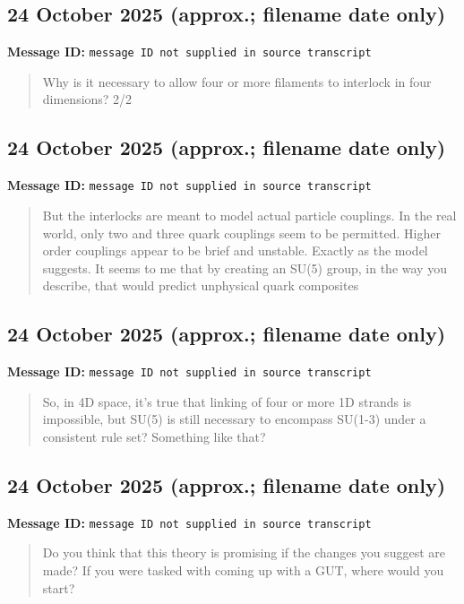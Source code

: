 \documentclass[11pt,letterpaper]{article}
\newcommand{\messageentry}[3]{%
  \Needspace{7\baselineskip}
  \subsection*{#1}
  {\small\textbf{Message ID:} \texttt{#2}}
  \vspace{2pt}
}
\begin{document}
\messageentry{24 October 2025 (approx.; filename date only)}{message ID not supplied in source transcript}{}
\begin{quote}\small
Why is it necessary to allow four or more filaments to interlock in four dimensions? 2/2
\end{quote}

\messageentry{24 October 2025 (approx.; filename date only)}{message ID not supplied in source transcript}{}
\begin{quote}\small
But the interlocks are meant to model actual particle couplings. In the real world, only two and three quark couplings seem to be permitted. Higher order couplings appear to be brief and unstable. Exactly as the model suggests. It seems to me that by creating an SU(5) group, in the way you describe, that would predict unphysical quark composites
\end{quote}

\messageentry{24 October 2025 (approx.; filename date only)}{message ID not supplied in source transcript}{}
\begin{quote}\small
So, in 4D space, it’s true that linking of four or more 1D strands is impossible, but SU(5) is still necessary to encompass SU(1-3) under a consistent rule set? Something like that?
\end{quote}

\messageentry{24 October 2025 (approx.; filename date only)}{message ID not supplied in source transcript}{}
\begin{quote}\small
Do you think that this theory is promising if the changes you suggest are made? If you were tasked with coming up with a GUT, where would you start?
\end{quote}
\end{document}

